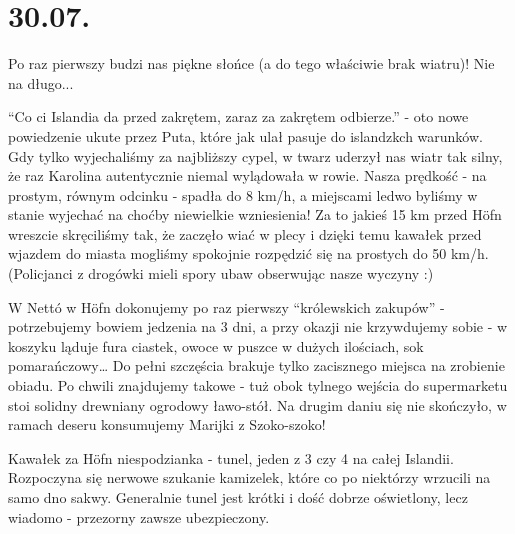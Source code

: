 \chapter{30.07.}

Po raz pierwszy budzi nas piękne słońce (a do tego właściwie brak wiatru)! Nie na długo...

“Co ci Islandia da przed zakrętem, zaraz za zakrętem odbierze.” - oto nowe powiedzenie ukute przez Puta, które jak ulał pasuje do islandzkch warunków. Gdy tylko wyjechaliśmy za najbliższy cypel, w twarz uderzył nas wiatr tak silny, że raz Karolina autentycznie niemal wylądowała w rowie. Nasza prędkość - na prostym, równym odcinku - spadła do 8 km/h, a miejscami ledwo byliśmy w stanie wyjechać na choćby niewielkie wzniesienia! Za to jakieś 15 km przed Höfn wreszcie skręciliśmy tak, że zaczęło wiać w plecy i dzięki temu kawałek przed wjazdem do miasta mogliśmy spokojnie rozpędzić się na prostych do 50 km/h. (Policjanci z drogówki mieli spory ubaw obserwując nasze wyczyny :)



W Nettó w Höfn dokonujemy po raz pierwszy “królewskich zakupów” - potrzebujemy bowiem jedzenia na 3 dni, a przy okazji nie krzywdujemy sobie - w koszyku ląduje fura ciastek, owoce w puszce w dużych ilościach, sok pomarańczowy… Do pełni szczęścia brakuje tylko zacisznego miejsca na zrobienie obiadu. Po chwili znajdujemy takowe - tuż obok tylnego wejścia do supermarketu stoi solidny drewniany ogrodowy ławo-stół. Na drugim daniu się nie skończyło, w ramach deseru konsumujemy Marijki z Szoko-szoko!


Kawałek za Höfn niespodzianka - tunel, jeden z 3 czy 4 na całej Islandii. Rozpoczyna się nerwowe szukanie kamizelek, które co po niektórzy wrzucili na samo dno sakwy. Generalnie tunel jest krótki i dość dobrze oświetlony, lecz wiadomo - przezorny zawsze ubezpieczony.

